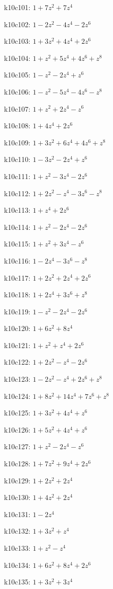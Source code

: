 k10c101: $ 1+7z^{2}+7z^{4} $ 

k10c102: $ 1-2z^{2}-4z^{4}-2z^{6} $ 

k10c103: $ 1+3z^{2}+4z^{4}+2z^{6} $ 

k10c104: $ 1+z^{2}+5z^{4}+4z^{6}+z^{8} $ 

k10c105: $ 1-z^{2}-2z^{4}+z^{6} $ 

k10c106: $ 1-z^{2}-5z^{4}-4z^{6}-z^{8} $ 

k10c107: $ 1+z^{2}+2z^{4}-z^{6} $ 

k10c108: $ 1+4z^{4}+2z^{6} $ 

k10c109: $ 1+3z^{2}+6z^{4}+4z^{6}+z^{8} $ 

k10c110: $ 1-3z^{2}-2z^{4}+z^{6} $ 

k10c111: $ 1+z^{2}-3z^{4}-2z^{6} $ 

k10c112: $ 1+2z^{2}-z^{4}-3z^{6}-z^{8} $ 

k10c113: $ 1+z^{4}+2z^{6} $ 

k10c114: $ 1+z^{2}-2z^{4}-2z^{6} $ 

k10c115: $ 1+z^{2}+3z^{4}-z^{6} $ 

k10c116: $ 1-2z^{4}-3z^{6}-z^{8} $ 

k10c117: $ 1+2z^{2}+2z^{4}+2z^{6} $ 

k10c118: $ 1+2z^{4}+3z^{6}+z^{8} $ 

k10c119: $ 1-z^{2}-2z^{4}-2z^{6} $ 

k10c120: $ 1+6z^{2}+8z^{4} $ 

k10c121: $ 1+z^{2}+z^{4}+2z^{6} $ 

k10c122: $ 1+2z^{2}-z^{4}-2z^{6} $ 

k10c123: $ 1-2z^{2}-z^{4}+2z^{6}+z^{8} $ 

k10c124: $ 1+8z^{2}+14z^{4}+7z^{6}+z^{8} $ 

k10c125: $ 1+3z^{2}+4z^{4}+z^{6} $ 

k10c126: $ 1+5z^{2}+4z^{4}+z^{6} $ 

k10c127: $ 1+z^{2}-2z^{4}-z^{6} $ 

k10c128: $ 1+7z^{2}+9z^{4}+2z^{6} $ 

k10c129: $ 1+2z^{2}+2z^{4} $ 

k10c130: $ 1+4z^{2}+2z^{4} $ 

k10c131: $ 1-2z^{4} $ 

k10c132: $ 1+3z^{2}+z^{4} $ 

k10c133: $ 1+z^{2}-z^{4} $ 

k10c134: $ 1+6z^{2}+8z^{4}+2z^{6} $ 

k10c135: $ 1+3z^{2}+3z^{4} $ 

